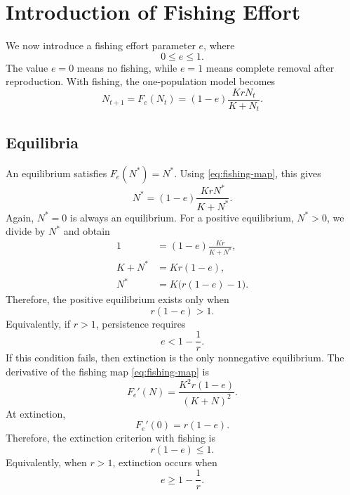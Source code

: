 \documentclass{article}
\numberwithin{equation}{section}
\begin{document}
\section{Introduction of Fishing Effort}
We now introduce a fishing effort parameter $e$, where
\begin{equation*}
    0 \leq e \leq 1.
\end{equation*}
The value $e=0$ means no fishing, while $e=1$ means complete removal
after reproduction. With fishing, the one-population model becomes
\begin{equation}
    \label{eq:fishing-map}
    N_{t+1}
    = F_e(N_t)
    = (1-e)\frac{K r N_t}{K+N_t}.
\end{equation}
\subsection{Equilibria}
An equilibrium satisfies $F_e(N^*)=N^*$. Using \eqref{eq:fishing-map},
this gives
\begin{equation*}
    N^* = (1-e)\frac{K r N^*}{K+N^*}.
\end{equation*}
Again, $N^*=0$ is always an equilibrium. For a positive equilibrium,
$N^*>0$, we divide by $N^*$ and obtain
\begin{align*}
    1 &= (1-e)\frac{K r}{K+N^*},\\
    K+N^* &= K r(1-e),\\
    N^* &= K\bigl(r(1-e)-1\bigr).
\end{align*}
Therefore, the positive equilibrium exists only when
\begin{equation*}
    r(1-e)>1.
\end{equation*}
Equivalently, if $r>1$, persistence requires
\begin{equation*}
    e < 1-\frac{1}{r}.
\end{equation*}
If this condition fails, then extinction is the only nonnegative
equilibrium.
The derivative of the fishing map \eqref{eq:fishing-map} is
\begin{equation*}
    F_e'(N)=\frac{K^2r(1-e)}{(K+N)^2}.
\end{equation*}
At extinction,
\begin{equation*}
    F_e'(0)=r(1-e).
\end{equation*}
Therefore, the extinction criterion with fishing is
\begin{equation*}
    r(1-e)\leq 1.
\end{equation*}
Equivalently, when $r>1$, extinction occurs when
\begin{equation}
    \label{eq:fishing-extinction-effort}
    e \geq 1-\frac{1}{r}.
\end{equation}
\end{document}
